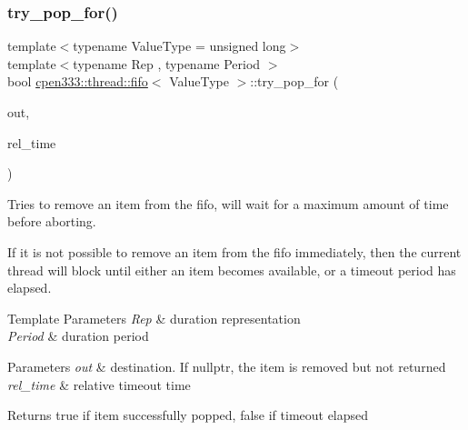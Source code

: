 \subsubsection{\texorpdfstring{try\+\_\+pop\+\_\+for()}{try\_pop\_for()}}
{\footnotesize\ttfamily template$<$typename Value\+Type  = unsigned long$>$ \\
template$<$typename Rep , typename Period $>$ \\
bool \hyperlink{classcpen333_1_1thread_1_1fifo}{cpen333\+::thread\+::fifo}$<$ Value\+Type $>$\+::try\+\_\+pop\+\_\+for (\begin{DoxyParamCaption}\item[{Value\+Type $\ast$}]{out,  }\item[{std\+::chrono\+::duration$<$ Rep, Period $>$ \&}]{rel\+\_\+time }\end{DoxyParamCaption})\hspace{0.3cm}{\ttfamily [inline]}}



Tries to remove an item from the fifo, will wait for a maximum amount of time before aborting. 

If it is not possible to remove an item from the fifo immediately, then the current thread will block until either an item becomes available, or a timeout period has elapsed.


\begin{DoxyTemplParams}{Template Parameters}
{\em Rep} & duration representation \\
\hline
{\em Period} & duration period \\
\hline
\end{DoxyTemplParams}

\begin{DoxyParams}{Parameters}
{\em out} & destination. If {\ttfamily nullptr}, the item is removed but not returned \\
\hline
{\em rel\+\_\+time} & relative timeout time \\
\hline
\end{DoxyParams}
\begin{DoxyReturn}{Returns}
{\ttfamily true} if item successfully popped, {\ttfamily false} if timeout elapsed 
\end{DoxyReturn}
\mbox{\label{classcpen333_1_1thread_1_1fifo_a72226dbbb37d6ff4690d56d769aa934e}} 
